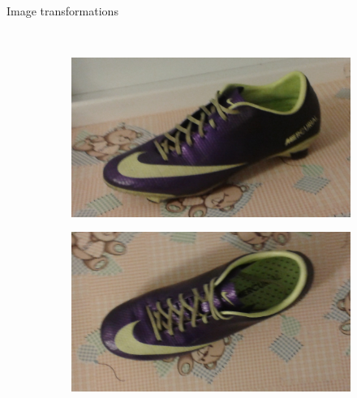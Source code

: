 \documentclass[14pt,t]{beamer}
\begin{document}
\begin{frame}{Image transformations}
\begin{figure}
\begin{subfigure}[t]{0.4\textwidth}
	\end{subfigure}\\
	\vspace{0.75mm}
	\begin{subfigure}[t]{0.4\textwidth}
		\includegraphics[width=\textwidth]{img/shoeRotation.jpg}
	\end{subfigure}
	\begin{subfigure}[t]{0.4\textwidth}
		\includegraphics[width=\textwidth]{img/shoeAbove.jpg}
	\end{subfigure}
\end{figure}
\end{frame}
%
\end{document}
